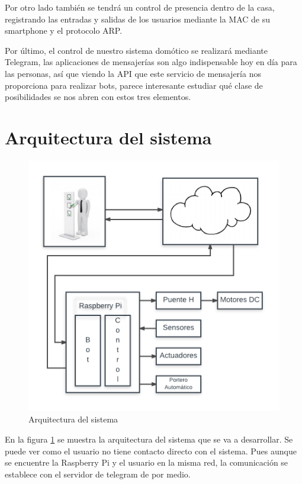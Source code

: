 \documentclass[10pt,journal,compsoc]{IEEEtran}
\begin{document}
Por otro lado también se tendrá un control de presencia dentro de la casa, registrando las 
entradas y salidas de los usuarios mediante la MAC de su smartphone y el protocolo ARP. 

Por último, el control de nuestro sistema domótico se realizará mediante Telegram, las aplicaciones 
de mensajerías son algo indispensable hoy en día para las personas, así que viendo la API que este 
servicio de mensajería nos proporciona para realizar bots, parece interesante estudiar qué clase de 
posibilidades se nos abren con estos tres elementos.

\section{Arquitectura del sistema}
\begin{figure}[h]
\centering
\includegraphics[scale=0.5]{ArqSist}
\caption{Arquitectura del sistema}
\label{fig:arqSist}
\end{figure}

En la figura \ref{fig:arqSist} se muestra la arquitectura del sistema que se va a desarrollar. 
Se puede ver como el usuario no tiene contacto directo con el sistema. Pues aunque se encuentre la 
Raspberry Pi y el usuario en la misma red, la comunicación se establece con el servidor de telegram 
de por medio.
\end{document}
